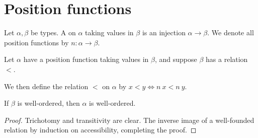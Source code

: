 \section{Position functions}

\begin{definition}
    Let \( \alpha, \beta \) be types.
    A  on \( \alpha \) taking values in \( \beta \) is an injection \( \alpha \to \beta \).
    We denote all position functions by \( n : \alpha \to \beta \).
\end{definition}
Let \( \alpha \) have a position function taking values in \( \beta \), and suppose \( \beta \) has a relation \( < \).
\begin{definition}
    We then define the relation \( < \) on \( \alpha \) by \( x < y \Leftrightarrow n\ x < n\ y \).
\end{definition}
\begin{lemma}
    If \( \beta \) is well-ordered, then \( \alpha \) is well-ordered.
\end{lemma}
\begin{proof}
    Trichotomy and transitivity are clear.
    The inverse image of a well-founded relation  by induction on accessibility, completing the proof.
\end{proof}
